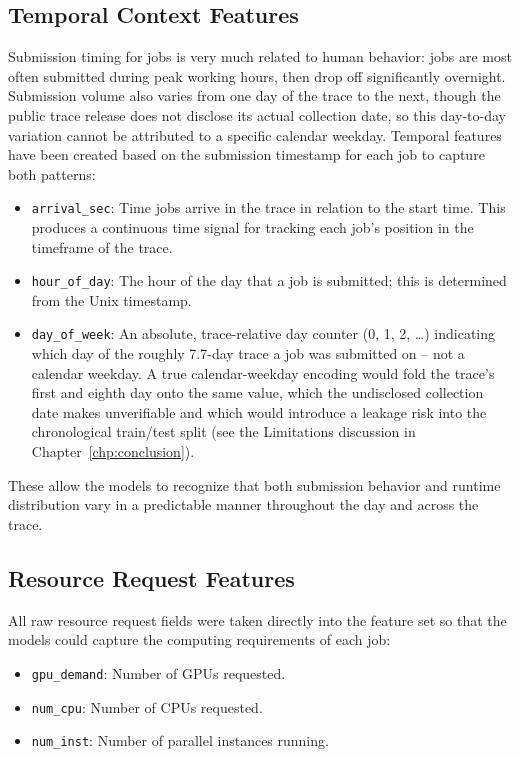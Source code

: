 \subsection{Temporal Context Features}

Submission timing for jobs is very much related to human behavior: jobs are most often submitted during peak working hours, then drop off significantly overnight. Submission volume also varies from one day of the trace to the next, though the public trace release does not disclose its actual collection date, so this day-to-day variation cannot be attributed to a specific calendar weekday. Temporal features have been created based on the submission timestamp for each job to capture both patterns:

\begin{itemize}
    \item \texttt{arrival\_sec}: Time jobs arrive in the trace in relation to the start time. This produces a continuous time signal for tracking each job's position in the timeframe of the trace.
    \item \texttt{hour\_of\_day}: The hour of the day that a job is submitted; this is determined from the Unix timestamp.
    \item \texttt{day\_of\_week}: An absolute, trace-relative day counter (0, 1, 2, \ldots) indicating which day of the roughly 7.7-day trace a job was submitted on -- not a calendar weekday. A true calendar-weekday encoding would fold the trace's first and eighth day onto the same value, which the undisclosed collection date makes unverifiable and which would introduce a leakage risk into the chronological train/test split (see the Limitations discussion in Chapter~\ref{chp:conclusion}).
\end{itemize}

These allow the models to recognize that both submission behavior and runtime distribution vary in a predictable manner throughout the day and across the trace.

\clearpage
\subsection{Resource Request Features}

All raw resource request fields were taken directly into the feature set so that the models could capture the computing requirements of each job:

\begin{itemize} 
    \item \texttt{gpu\_demand}: Number of GPUs requested.
    \item \texttt{num\_cpu}: Number of CPUs requested.
    \item \texttt{num\_inst}: Number of parallel instances running.
\end{itemize}

